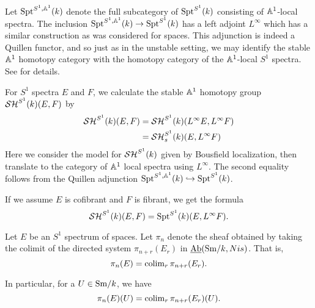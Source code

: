 \documentclass{amsart}%
\begin{document}
\begin{remark}
  Let $\mathrm{Spt}^{S^1,\mathbb{A}^1}(k)$ denote the full subcategory of
  $\mathrm{Spt}^{S^1}(k)$ consisting of $\mathbb{A}^1$-local spectra. The inclusion
  $\mathrm{Spt}^{S^1, \mathbb{A}^1}(k) \to \mathrm{Spt}^{S^1}(k)$ has a left adjoint
  $L^{\infty}$ which has a similar construction as was considered for
  spaces. This adjunction is indeed a Quillen functor, and so just as
  in the unstable setting, we may identify the stable $\mathbb{A}^1$
  homotopy category with the homotopy category of the $\mathbb{A}^1$-local
  $S^1$ spectra. See \cite[\S4.2]{Mor05} for details.


  For $S^1$ spectra $E$ and $F$, we calculate the stable $\mathbb{A}^1$
  homotopy group$\mathcal{SH}^{S^1}(k)(E,F)$ by
  \begin{align*}
    \mathcal{SH}^{S^1}(k)(E,F) & = \mathcal{SH}^{S^1}(k)(L^{\infty} E, L^{\infty} F)\\
                      &= \mathcal{SH}^{S^1}_s(k)(E,L^{\infty}F)
  \end{align*}
  Here we consider the model for $\mathcal{SH}^{S^1}(k)$ given by Bousfield
  localization, then translate to the category of $\mathbb{A}^1$ local
  spectra using $L^{\infty}$. The second equality follows from the
  Quillen adjunction $\mathrm{Spt}^{S^1,\mathbb{A}^1}(k) \hookrightarrow \mathrm{Spt}^{S^1}(k)$.

  If we assume $E$ is cofibrant and $F$ is fibrant, we get the formula
  \begin{equation*}
    \mathcal{SH}^{S^1}(k)(E,F) = \mathrm{Spt}^{S^1}(k)(E,L^{\infty}F).
  \end{equation*}
\end{remark}

\begin{definition}
  Let $E$ be an $S^1$ spectrum of spaces. Let $\pi_n$ denote the sheaf
  obtained by taking the colimit of the directed system
  $\pi_{n+r}(E_r)$ in $\operatorname{\underline{Ab}}(\mathrm{Sm}/k,Nis)$. That is,
  \begin{equation*}
    \pi_n(E) = \operatorname{colim}_{r} \pi_{n+r}(E_r). 
  \end{equation*}

  In particular, for a $U \in \mathrm{Sm}/k$, we have 
  \begin{equation*}
    \pi_n(E)(U) = \operatorname{colim}_{r} \pi_{n+r}(E_r)(U).
  \end{equation*}
\end{definition}
\end{document}
